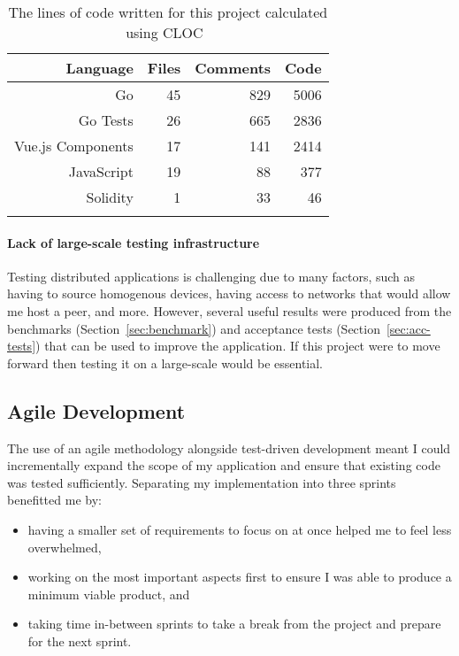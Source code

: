 \begin{longtable}{ | r | r | r | r | }
  \hline
  \textbf{Language} & \textbf{Files} & \textbf{Comments} & \textbf{Code}
  \\\hline
  Go
  & 45
  & 829
  & 5006
  \\\hline
  Go Tests
  & 26
  & 665
  & 2836
  \\\hline
  Vue.js Components
  & 17
  & 141
  & 2414
  \\\hline
  JavaScript
  & 19
  & 88
  & 377
  \\\hline
  Solidity
  & 1
  & 33
  & 46
  \\\hline
  \caption{The lines of code written for this project calculated using CLOC~\cite{noauthor_aldanialcloc_nodate}}
  \label{tab:cloc}
\end{longtable}

\paragraph*{Lack of large-scale testing infrastructure}
Testing distributed applications is challenging due to many factors, such as having to source homogenous devices, having access to networks that would allow me host a peer, and more. However, several useful results were produced from the benchmarks (Section~\ref{sec:benchmark}) and acceptance tests (Section~\ref{sec:acc-tests}) that can be used to improve the application. If this project were to move forward then testing it on a large-scale would be essential.

\subsection*{Agile Development}

The use of an agile methodology alongside test-driven development meant I could incrementally expand the scope of my application and ensure that existing code was tested sufficiently. Separating my implementation into three sprints benefitted me by:

\begin{itemize}
  \item having a smaller set of requirements to focus on at once helped me to feel less overwhelmed,
  \item working on the most important aspects first to ensure I was able to produce a minimum viable product, and
  \item taking time in-between sprints to take a break from the project and prepare for the next sprint.
\end{itemize}



